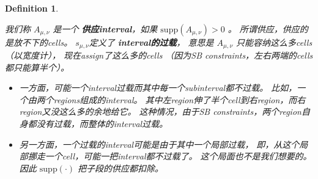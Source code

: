 \documentclass[UTF8,a4paper]{ctexart}
\renewcommand{\emph}[1]{\textbf{#1}}
\newcommand{\supp}[1]{\text{supp} ({#1})}
\newtheorem{definition}{Definition}
\begin{document}
\begin{definition}
\begin{description}
        我们称 $A_{\mu,\nu}$ 是一个 \emph{供应interval}，如果 $\supp{A_{\mu,\nu}}>0$ 。
        所谓供应，供应的是放不下的cells。
        $s_{\mu,\nu}$定义了 \emph{interval的过载}，
        意思是 $A_{\mu,\nu}$ 只能容纳这么多cells（以宽度计），
        现在assign了这么多的cells
        （因为SB constraints，左右两端的cells都只能算半个）。
        \begin{itemize}
        \item 一方面，可能一个interval过载而其中每一个subinterval都不过载。
            比如，一个由两个regions组成的interval。
            其中左region伸了半个cell到右region，而右region又没这么多的余地给它。
            这种情况，由于SB constraints，两个region自身都没有过载，而整体的interval过载。
        \item 另一方面，一个过载的interval可能是由于其中一个局部过载，
            即，从这个局部挪走一个cell，可能一把interval都不过载了。
            这个局面也不是我们想要的。
            因此 $\supp{\cdot}$ 把子段的供应都扣除。
        \end{itemize}


\end{description}
\end{definition}
\end{document}
